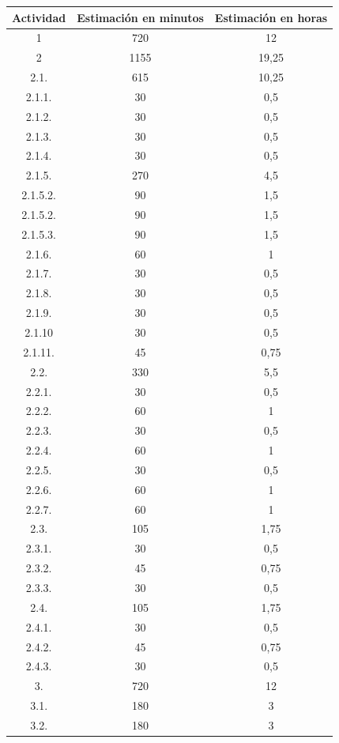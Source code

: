 \begin{longtable}{c|c|c}
\textbf{Actividad} & \textbf{Estimación en minutos} & \textbf{Estimación en horas} \\ \hline
1 & 720 & 12 \\ \hline
2 & 1155 & 19,25 \\ \hline
2.1. & 615 & 10,25 \\ \hline
2.1.1. & 30 & 0,5 \\ \hline
2.1.2. & 30 & 0,5 \\ \hline
2.1.3. & 30 & 0,5 \\ \hline
2.1.4. & 30 & 0,5 \\ \hline
2.1.5. & 270 & 4,5 \\ \hline
2.1.5.2. & 90 & 1,5 \\ \hline
2.1.5.2. & 90 & 1,5 \\ \hline
2.1.5.3. & 90 & 1,5 \\ \hline
2.1.6. & 60 & 1 \\ \hline
2.1.7. & 30 & 0,5 \\ \hline
2.1.8. & 30 & 0,5 \\ \hline
2.1.9. & 30 & 0,5 \\ \hline
2.1.10 & 30 & 0,5 \\ \hline
2.1.11. & 45 & 0,75 \\ \hline
2.2. & 330 & 5,5 \\ \hline
2.2.1. & 30 & 0,5 \\ \hline
2.2.2. & 60 & 1 \\ \hline
2.2.3. & 30 & 0,5 \\ \hline
2.2.4. & 60 & 1 \\ \hline
2.2.5. & 30 & 0,5 \\ \hline
2.2.6. & 60 & 1 \\ \hline
2.2.7. & 60 & 1 \\ \hline
2.3. & 105 & 1,75 \\ \hline
2.3.1. & 30 & 0,5 \\ \hline
2.3.2. & 45 & 0,75 \\ \hline
2.3.3. & 30 & 0,5 \\ \hline
2.4. & 105 & 1,75 \\ \hline
2.4.1. & 30 & 0,5 \\ \hline
2.4.2. & 45 & 0,75 \\ \hline
2.4.3. & 30 & 0,5 \\ \hline
3. & 720 & 12 \\ \hline
3.1. & 180 & 3 \\ \hline
3.2. & 180 & 3 \\ \hline

\end{longtable}
